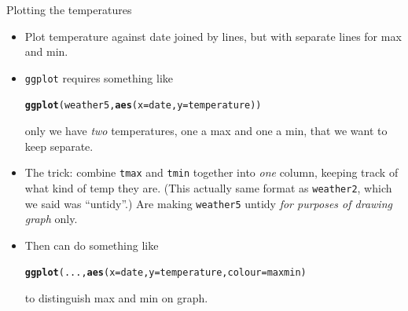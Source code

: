 \documentclass[unknownkeysallowed]{beamer}\usepackage[]{graphicx}\usepackage[]{color}
\makeatletter
\newcommand{\hlstd}[1]{\textcolor[rgb]{0.345,0.345,0.345}{#1}}%
\newcommand{\hlkwc}[1]{\textcolor[rgb]{0.333,0.667,0.333}{#1}}%
\newcommand{\hlkwd}[1]{\textcolor[rgb]{0.737,0.353,0.396}{\textbf{#1}}}%
\newenvironment{kframe}{%
 \def\at@end@of@kframe{}%
 \ifinner\ifhmode%
  \def\at@end@of@kframe{\end{minipage}}%
  \begin{minipage}{\columnwidth}%
 \fi\fi%
 \def\FrameCommand##1{\hskip\@totalleftmargin \hskip-\fboxsep
 \colorbox{shadecolor}{##1}\hskip-\fboxsep
     \hskip-\linewidth \hskip-\@totalleftmargin \hskip\columnwidth}%
 \MakeFramed {\advance\hsize-\width
   \@totalleftmargin\z@ \linewidth\hsize
   \@setminipage}}%
 {\par\unskip\endMakeFramed%
 \at@end@of@kframe}
\newenvironment{knitrout}{}{} %
\makeatother
\begin{document}
\begin{frame}[fragile]{Plotting the temperatures}
  
  \begin{itemize}
  \item Plot temperature against date joined by lines, but with
    separate lines for max and min.
  \item \texttt{ggplot} requires something like
\begin{knitrout}
\color{fgcolor}\begin{kframe}
\begin{alltt}
\hlkwd{ggplot}\hlstd{(weather5,}\hlkwd{aes}\hlstd{(}\hlkwc{x}\hlstd{=date,}\hlkwc{y}\hlstd{=temperature))}
\end{alltt}
\end{kframe}
\end{knitrout}
only we have \emph{two} temperatures, one a max and one a min, that we
want to keep separate.
\item The trick: combine \texttt{tmax}  and \texttt{tmin} together
  into \emph{one} column, keeping track of what kind of temp they
  are. (This actually same format as \texttt{weather2}, which we said
  was ``untidy''.) Are making \texttt{weather5} untidy \emph{for
    purposes of drawing graph} only.
\item Then can do something like
\begin{knitrout}
\color{fgcolor}\begin{kframe}
\begin{alltt}
\hlkwd{ggplot}(...,\hlkwd{aes}(x=date,y=temperature,colour=maxmin)
\end{alltt}
\end{kframe}
\end{knitrout}
to distinguish max and min on graph.
  \end{itemize}
  
\end{frame}
\end{document}
